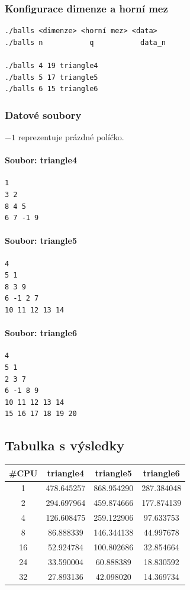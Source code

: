 \documentclass[12pt,a4paper]{article}
\begin{document}
\subsubsection{Konfigurace dimenze a horní mez}
\begin{verbatim}
./balls <dimenze> <horní mez> <data>
./balls n 			q 			data_n

./balls 4 19 triangle4
./balls 5 17 triangle5
./balls 6 15 triangle6
\end{verbatim}



\subsubsection{Datové soubory}
$ -1 $ reprezentuje prázdné políčko.

\paragraph{Soubor: triangle4}
\begin{verbatim}
1
3 2
8 4 5
6 7 -1 9
\end{verbatim}

\paragraph{Soubor: triangle5}
\begin{verbatim}
4
5 1
8 3 9
6 -1 2 7
10 11 12 13 14
\end{verbatim}

\paragraph{Soubor: triangle6}
\begin{verbatim}
4
5 1
2 3 7
6 -1 8 9
10 11 12 13 14
15 16 17 18 19 20
\end{verbatim}

\medskip


\subsection{Tabulka s výsledky}
\begin{center}
\begin{tabular}{ | c || c | c | c | }
\hline
\#CPU    &   triangle4		&	triangle5	&	triangle6	\\
\hline
\hline
1    &   478.645257		&	868.954290	&	287.384048		\\ \hline
2    &   294.697964		&	459.874666	&	177.874139		\\ \hline
4    &   126.608475		&	259.122906	&	97.633753		\\	 \hline
8    &   86.888339		&	146.344138	&	44.997678		\\	 \hline
16   &   52.924784		&	100.802686	&	32.854664		\\	 \hline
24   &   33.590004		&	60.888389	&	18.830592		\\ \hline
32   &   27.893136		&	42.098020	&	14.369734		\\ \hline
\end{tabular}
\end{center}
\end{document}
